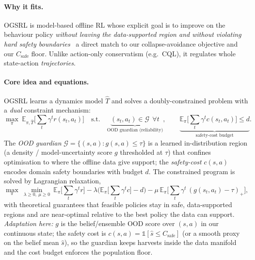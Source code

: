 \documentclass[11pt]{article}
\newcommand{\Csafe}{C_{\mathrm{safe}}}
\begin{document}
\paragraph{Why it fits.} OGSRL is model-based offline RL whose explicit goal is to
improve on the behaviour policy \emph{without leaving the data-supported region and
without violating hard safety boundaries} \textemdash\ a direct match to our
collapse-avoidance objective and our $\Csafe$ floor. Unlike action-only
conservatism (e.g.\ CQL), it regulates whole state-action \emph{trajectories}.
\paragraph{Core idea and equations.} OGSRL learns a dynamics model $\widehat{T}$
and solves a doubly-constrained problem with a \emph{dual} constraint mechanism:
\begin{equation}
\max_{\pi}\ \mathbb{E}_{\pi,\widehat{T}}\!\Big[\textstyle\sum_{t}\gamma^t r(s_t,a_t)\Big]
\quad \text{s.t.}\quad
\underbrace{(s_t,a_t)\in\mathcal{G}\ \ \forall t}_{\text{OOD guardian (reliability)}},
\qquad
\underbrace{\mathbb{E}_{\pi}\!\Big[\textstyle\sum_t \gamma^t c(s_t,a_t)\Big]\le d}_{\text{safety-cost budget}} .
\label{eq:ogsrl}
\end{equation}
The \emph{OOD guardian} $\mathcal{G}=\{(s,a): g(s,a)\le \tau\}$ is a learned
in-distribution region (a density / model-uncertainty score $g$ thresholded at
$\tau$) that confines optimisation to where the offline data give support; the
\emph{safety-cost} $c(s,a)$ encodes domain safety boundaries with budget $d$. The
constrained program is solved by Lagrangian relaxation,
\begin{equation}
\max_{\pi}\ \min_{\lambda\ge 0,\ \mu\ge 0}\
\mathbb{E}_{\pi}\Big[\textstyle\sum_t\gamma^t r\Big]
- \lambda\Big(\mathbb{E}_{\pi}\big[\textstyle\sum_t\gamma^t c\big]-d\Big)
- \mu\,\mathbb{E}_{\pi}\big[\textstyle\sum_t\gamma^t\,(g(s_t,a_t)-\tau)_+\big],
\label{eq:ogsrl-lag}
\end{equation}
with theoretical guarantees that feasible policies stay in safe, data-supported
regions and are near-optimal relative to the best policy the data can support.
\emph{Adaptation here:} $g$ is the belief/ensemble OOD score over $(s,a)$ in our
continuous state; the safety cost is $c(s,a)=\mathbb{1}[\hat s \le \Csafe]$ (or a
smooth proxy on the belief mean $\hat s$), so the guardian keeps harvests inside
the data manifold and the cost budget enforces the population floor.
\end{document}

